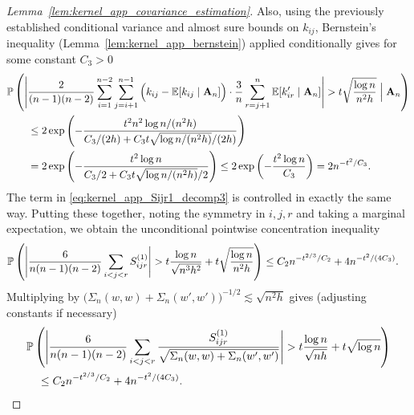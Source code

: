 \begin{proof}[Lemma~\ref{lem:kernel_app_covariance_estimation}]
  Also, using the previously established conditional variance
  and almost sure bounds on $k_{i j}$,
  Bernstein's inequality
  (Lemma~\ref{lem:kernel_app_bernstein})
  applied conditionally
  gives for some constant $C_3 > 0$
  \begin{align*}
    &\P\left(
      \Bigg|
      \frac{2}{(n-1)(n-2)}
      \sum_{i=1}^{n-2}
      \sum_{j=i+1}^{n-1}
      \Big(
        k_{i j}
        - \E[k_{i j} \mid \bA_n]
      \Big)
      \cdot \frac{3}{n}
      \sum_{r=j+1}^n
      \E[k_{i r}' \mid \bA_n]
      \Bigg|
      > t
      \sqrt{\frac{\log n}{n^2h}}
      \Bigm\vert \bA_n
    \right) \\
    &\qquad\leq
    2 \exp \left( -
      \frac{t^2 n^2 \log n / (n^2h)}
      {C_3/(2h) + C_3 t \sqrt{\log n / (n^2h)} / (2h)}
    \right) \\
    &\qquad=
    2 \exp \left( -
      \frac{t^2 \log n}
      {C_3/2 + C_3 t \sqrt{\log n / (n^2h)} / 2}
    \right)
    \leq
    2 \exp \left( -
      \frac{t^2 \log n}{C_3}
    \right)
    =
    2 n^{-t^2 / C_3}.
  \end{align*}
  The term in \eqref{eq:kernel_app_Sijr1_decomp3}
  is controlled in exactly the same way.
  Putting these together, noting the symmetry in $i,j,r$
  and taking a marginal expectation,
  we obtain the unconditional pointwise concentration inequality
  \begin{align*}
    \P\left(
      \Bigg|
      \frac{6}{n(n-1)(n-2)}
      \sum_{i<j<r}
      S_{i j r}^{(1)}
      \Bigg|
      > t
      \frac{\log n}{\sqrt{n^3h^2}}
      + t \sqrt{\frac{\log n}{n^2h}}
    \right)
    &\leq
    C_2 n^{-t^{2/3} / C_2}
    + 4 n^{-t^2 / (4C_3)}.
  \end{align*}
  Multiplying by
  $\big(\Sigma_n(w,w) + \Sigma_n(w',w')\big)^{-1/2} \lesssim \sqrt{n^2h}$
  gives (adjusting constants if necessary)
  \begin{align*}
    &\P\left(
      \Bigg|
      \frac{6}{n(n-1)(n-2)}
      \sum_{i<j<r}
      \frac{S_{i j r}^{(1)}}
      {\sqrt{\Sigma_n(w,w) + \Sigma_n(w',w')}}
      \Bigg|
      > t \frac{\log n}{\sqrt{n h}}
      + t \sqrt{\log n}
    \right) \\
    &\quad\leq
    C_2 n^{-t^{2/3} / C_2}
    + 4 n^{-t^2 / (4C_3)}.
  \end{align*}



\end{proof}
